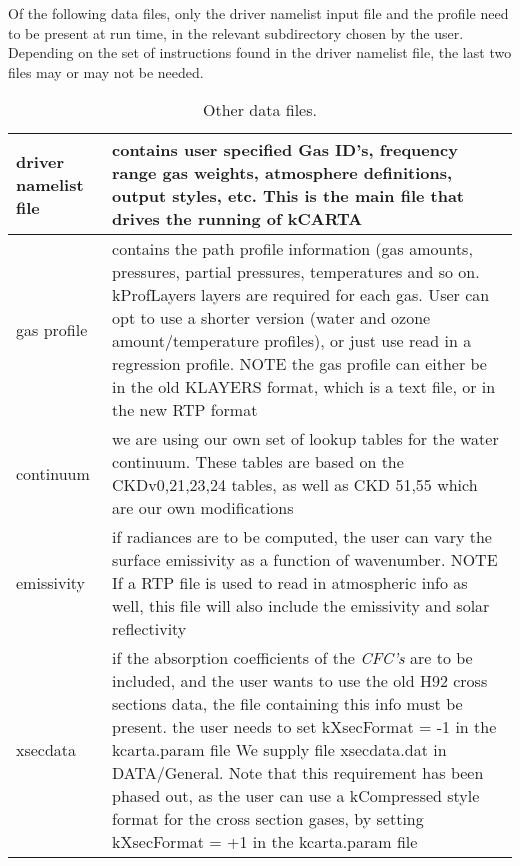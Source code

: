 \documentclass[12pt]{article}
\newcommand{\kc}{\textsf{kCARTA}\xspace}
\newlength{\colwidth}
\begin{document}
Of the following data files, only the driver namelist input file and the 
profile need to be present at run time, in the relevant subdirectory chosen 
by the user. Depending on the set of instructions found in the driver 
namelist file, the last two files may or may not be needed.\\
\begin{small}
\begin{longtable}{|l|p{\colwidth}|}
\caption{Other data files.}\\
\hline
driver namelist file & contains user specified Gas ID's, frequency range
            gas weights, atmosphere definitions, output styles, etc.
            This is the main file that drives the running of \kc\\ \hline
gas profile & contains the path profile information (gas amounts,
            pressures, partial pressures, temperatures and so on.
            kProfLayers layers are required for each gas.
            User can opt to use a shorter version (water and ozone 
            amount/temperature profiles), or just use read in a 
            regression profile.
            NOTE the gas profile can either be in the old KLAYERS format, 
            which is a text file, or in the new RTP format\\ \hline
continuum  & we are using our own set of lookup tables for the water
             continuum. These tables are based on the CKDv0,21,23,24 tables,
             as well as CKD 51,55 which are our own modifications\\ \hline
emissivity  & if radiances are to be computed, the user can vary the
            surface emissivity as a function of wavenumber.
            NOTE If a RTP file is used to read in atmospheric info as well,
            this file will also include the emissivity and solar reflectivity\\
            \hline
xsecdata  & if the absorption coefficients of the {\em CFC's} are to be
            included, and the user wants to use the old H92 cross sections
            data, the file containing this info must be present. the user needs
            to set  kXsecFormat = -1 in the kcarta.param file 
            We supply file xsecdata.dat in {\sf DATA/General}.
            Note that this requirement has been phased out, as the user can 
            use a kCompressed style format for the cross section gases, by
            setting  kXsecFormat = +1  in the kcarta.param file\\ \hline
\end{longtable}
\end{small}
\end{document}
